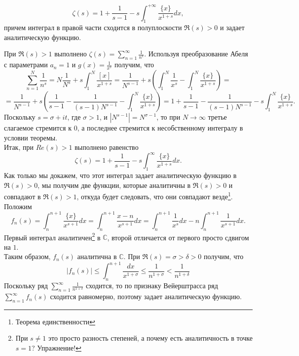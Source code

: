 \begin{theorem} \label{l3_thm5}
	$$\zeta(s) = 1 + \frac{1}{s - 1} - s \int_{1}^{+\infty} \frac{\{x\}}{x^{1 + s}} dx,$$
	причем интеграл в правой части сходится в полуплоскости $\Re(s) > 0$ и задает аналитическую функцию.
\end{theorem}
\begin{pf}
	При $\Re(s) > 1$ выполнено $\displaystyle \zeta(s) = \sum_{n = 1}^{\infty} \frac{1}{n^s}$. Используя преобразование Абеля с параметрами $a_n = 1$ и $\displaystyle g(x) = \frac{1}{x^s}$ получим, что 
	$$\sum_{n = 1}^{N} \frac{1}{n^s} = N \frac{1}{N^s} + s \int_{1}^{N}\frac{[x]}{x^{1 + s}} = \frac{1}{N^{s - 1}} + s \left( \int_{1}^{N}\frac{1}{x^s} - \int_{1}^{N}\frac{\{x\}}{x^{1 + s}}\right) = $$
	$$ = \frac{1}{N^{s - 1}} + s \left( \frac{1}{s - 1} - \frac{1}{(s - 1)N^{s - 1}} - \int_{1}^{N}\frac{\{x\}}{x^{1 + s}}\right) = 1 + \frac{1}{s - 1} - \frac{1}{(s - 1)N^{s - 1}} - s \int_{1}^{N}\frac{\{x\}}{x^{1 + s}}.$$
	Поскольку $s = \sigma + i t$, где $\sigma > 1$, и $|N^{s - 1}| = N^{\sigma - 1}$, то при $N \rightarrow \infty $ третье слагаемое стремится к 0, а последнее стремится к несобственному интегралу в условии теоремы.\\
	Итак, при $Re(s) > 1$ выполнено равенство
	$$\zeta(s) = 1 + \frac{1}{s - 1} - s \int_{1}^{\infty} \frac{\{x\}}{x^{1 + s}} dx.$$
	Как только мы докажем, что этот интеграл задает аналитическую функцию в $\Re(s) > 0$, мы получим 	две функции, которые аналитичны в $\Re(s) > 0$ и совпадают  в $\Re(s) > 1$, откуда будет следовать, что они совпадают везде\footnote{Теорема единственности}.\\
	Положим 
	$$f_n(s) = \int_{n}^{n + 1} \frac{\{x\}}{x^{s + 1}} dx = \int_{n}^{n + 1} \frac{x - n}{x^{s + 1}} dx = \int_{n}^{n + 1} \frac{1}{x^{s}} dx - n \int_{n}^{n + 1} \frac{1}{x^{s + 1}} dx.$$ 
	Первый интеграл аналитичен\footnote{При $s \ne 1$ это просто разность степеней, а почему есть аналитичность в точке $s = 1$? Упражнение!} в $\mathbb{C}$, второй отличается от первого просто сдвигом на $1$.\\
	Таким образом, $f_n(s)$ аналитична в $\mathbb{C}$. При $\Re(s) = \sigma > \delta > 0$ получим, что 
	$$|f_n(s)| \leq \int_{n}^{n + 1} \frac{dx}{x^{1 + \sigma}} \leq \frac{1}{n^{1 + \sigma}} < \frac{1}{n^{1 + \delta}}$$
	Поскольку ряд $\displaystyle \sum_{n = 1}^{\infty} \frac{1}{n^{1 + \delta}}$ сходится, то по признаку Вейерштрасса ряд $\displaystyle \sum_{n = 1}^{\infty} f_n(s)$ сходится равномерно, поэтому задает аналитическую функцию.
\end{pf}

